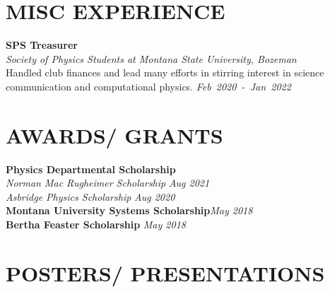 \documentclass[margin]{res}
\begin{document}
\begin{resume}

\section{MISC EXPERIENCE}

\noindent
\raggedright
\textbf{\textbf{SPS Treasurer}}\\
{\sl Society of Physics Students at Montana State University, Bozeman}\\\vspace{0.5ex}
Handled club finances and lead many efforts in stirring interest in science communication and computational physics.   \hfill
{\sl Feb~2020~-~Jan~2022}

\section{AWARDS/ GRANTS}
\textbf{Physics Departmental Scholarship}\\
\hspace{3ex} {\sl Norman Mac Rugheimer Scholarship} \hfill {\sl Aug 2021}\\\vspace{0.5ex}
\hspace{3ex} {\sl Asbridge Physics Scholarship} \hfill {\sl Aug 2020}\\\vspace{0.5ex}
\textbf{Montana University Systems Scholarship}\hfill\hfil {\sl May 2018}\\\vspace{0.5ex}
\textbf{Bertha Feaster Scholarship} \hfill {\sl May 2018}

\section{POSTERS/ PRESENTATIONS}


\end{resume}
\end{document}
